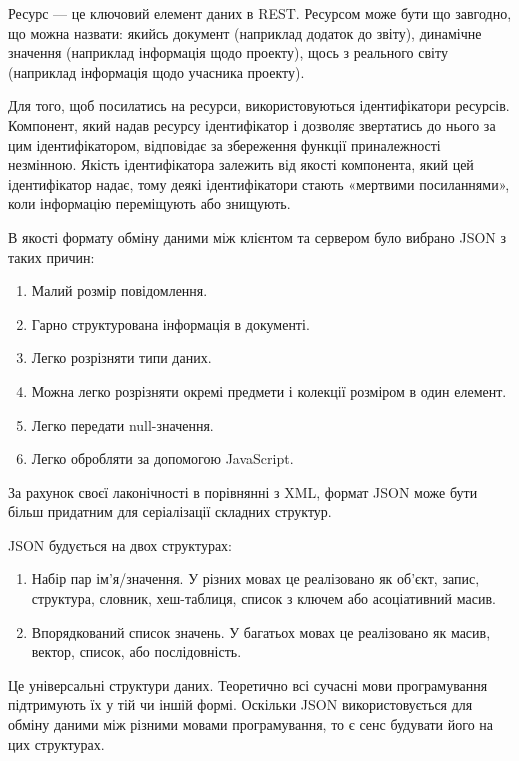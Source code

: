 \documentclass[../main.tex]{subfiles}
\begin{document}
Ресурс — це ключовий елемент даних в REST. Ресурсом може бути що завгодно, що можна назвати: якийсь документ (наприклад додаток до звіту), динамічне значення (наприклад інформація щодо проекту), щось з реального світу (наприклад інформація щодо учасника проекту).

Для того, щоб посилатись на ресурси, використовуються ідентифікатори ресурсів. Компонент, який надав ресурсу ідентифікатор і дозволяє звертатись до нього за цим ідентифікатором, відповідає за збереження функції приналежності незмінною. Якість ідентифікатора залежить від якості компонента, який цей ідентифікатор надає, тому деякі ідентифікатори стають «мертвими посиланнями», коли інформацію переміщують або знищують.

В якості формату обміну даними між клієнтом та сервером було вибрано JSON з таких причин:
\begin{enumerate}
	\item Малий розмір повідомлення.
	\item Гарно структурована інформація в документі.
	\item Легко розрізняти типи даних.
	\item Можна легко розрізняти окремі предмети і колекції розміром в один елемент.
	\item Легко передати null-значення.
	\item Легко обробляти за допомогою JavaScript.
\end{enumerate}

За рахунок своєї лаконічності в порівнянні з XML, формат JSON може бути більш придатним для серіалізації складних структур.

JSON будується на двох структурах:
\begin{enumerate}
	\item Набір пар ім'я/значення. У різних мовах це реалізовано як об'єкт, запис, структура, словник, хеш-таблиця, список з ключем або асоціативний масив.
	\item Впорядкований список значень. У багатьох мовах це реалізовано як масив, вектор, список, або послідовність.
\end{enumerate}

Це універсальні структури даних. Теоретично всі сучасні мови програмування підтримують їх у тій чи іншій формі. Оскільки JSON використовується для обміну даними між різними мовами програмування, то є сенс будувати його на цих структурах.
\end{document}
